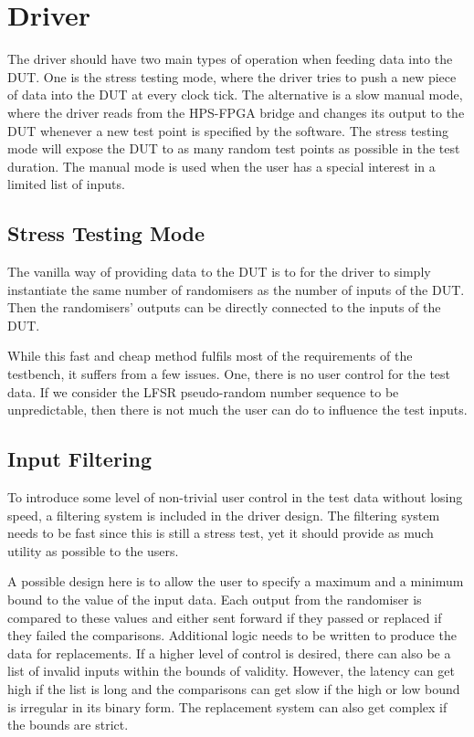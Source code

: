 \section{Driver}

The driver should have two main types of operation when feeding data into the DUT.
One is the stress testing mode, where the driver tries to push a new piece of data into the DUT at every clock tick.
The alternative is a slow manual mode, where the driver reads from the HPS-FPGA bridge and changes its output to the DUT whenever a new test point is specified by the software.
The stress testing mode will expose the DUT to as many random test points as possible in the test duration.
The manual mode is used when the user has a special interest in a limited list of inputs.

\subsection{Stress Testing Mode}
The vanilla way of providing data to the DUT is to for the driver to simply instantiate the same number of randomisers as the number of inputs of the DUT.
Then the randomisers' outputs can be directly connected to the inputs of the DUT.

While this fast and cheap method fulfils most of the requirements of the testbench, it suffers from a few issues.
One, there is no user control for the test data.
If we consider the LFSR pseudo-random number sequence to be unpredictable, then there is not much the user can do to influence the test inputs.

\subsection{Input Filtering}
To introduce some level of non-trivial user control in the test data without losing speed, a filtering system is included in the driver design.
The filtering system needs to be fast since this is still a stress test, yet it should provide as much utility as possible to the users.

A possible design here is to allow the user to specify a maximum and a minimum bound to the value of the input data.
Each output from the randomiser is compared to these values and either sent forward if they passed or replaced if they failed the comparisons.
Additional logic needs to be written to produce the data for replacements.
If a higher level of control is desired, there can also be a list of invalid inputs within the bounds of validity.
However, the latency can get high if the list is long and the comparisons can get slow if the high or low bound is irregular in its binary form.
The replacement system can also get complex if the bounds are strict.


